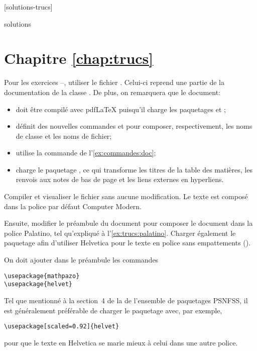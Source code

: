 [solutions-trucs]

\begin{Filesave}{solutions}
\section*{Chapitre \ref*{chap:trucs}}

\end{Filesave}

\noindent%
Pour les exercices
\nolink{\ref{exercice:trucs:1}}--\nolink{\ref{exercice:trucs:n}},
utiliser le fichier . Celui-ci reprend
une partie de la documentation de la classe . De plus,
on remarquera que le document:
\begin{itemize}
\item doit être compilé avec pdf{\LaTeX} puisqu'il charge les
  paquetages  et ;
\item définit des nouvelles commandes \cmdprint{\class} et
  \cmdprint{\fichier} pour composer, respectivement, les noms de
  classe et les noms de fichier;
\item utilise la commande \cmdprint{\doc} de
  l'\autoref{ex:commandes:doc};
\item charge le paquetage , ce qui transforme les titres
  de la table des matières, les renvois aux notes de bas de page et
  les liens externes en hyperliens.
\end{itemize}
\medskip

\begin{exercice}
  \label{exercice:trucs:1}
  Compiler et visualiser le fichier sans aucune modification. Le texte
  est composé dans la police par défaut Computer Modern.

  Ensuite, modifier le préambule du document pour composer le document
  dans la police Palatino, tel qu'expliqué à
  l'\autoref{ex:trucs:palatino}. Charger également le paquetage
   afin d'utiliser Helvetica pour le texte en police sans
  empattements (\cmdprint{\textsf}).
  \begin{sol}
    On doit ajouter dans le préambule les commandes
\begin{lstlisting}
\usepackage{mathpazo}
\usepackage{helvet}
\end{lstlisting}
    Tel que mentionné à la section~4 de la %
    de l'ensemble de paquetages PSNFSS, il est généralement préférable
    de charger le paquetage  avec, par exemple,
\begin{lstlisting}
\usepackage[scaled=0.92]{helvet}
\end{lstlisting}
    pour que le texte en Helvetica se marie mieux à celui dans une
    autre police.
  \end{sol}
\end{exercice}


